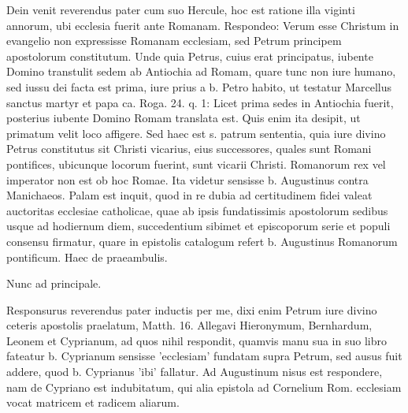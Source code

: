 Dein venit reverendus pater cum suo Hercule, hoc est ratione illa viginti annorum, ubi ecclesia fuerit ante Romanam. Respondeo: Verum esse Christum in evangelio non expressisse Romanam ecclesiam, sed Petrum principem apostolorum constitutum. Unde quia Petrus, cuius erat principatus, iubente Domino transtulit sedem ab Antiochia ad Romam, quare tunc non iure humano, sed iussu dei facta est prima, iure prius a b. Petro habito, ut testatur Marcellus sanctus martyr et papa ca. Roga. 24. q. 1: Licet prima sedes in Antiochia fuerit, posterius iubente Domino Romam translata est. Quis enim ita desipit, ut primatum velit loco affigere. Sed haec est s. patrum sententia, quia iure divino Petrus constitutus sit Christi vicarius, eius successores, quales sunt Romani pontifices, ubicunque locorum fuerint, sunt vicarii Christi. Romanorum rex vel imperator non est ob hoc Romae. Ita videtur sensisse b. Augustinus contra Manichaeos. Palam est inquit, quod in re dubia ad certitudinem fidei valeat auctoritas ecclesiae catholicae, quae ab ipsis fundatissimis apostolorum sedibus usque ad hodiernum diem, succedentium sibimet et episcoporum serie et populi consensu firmatur, quare in epistolis catalogum refert b. Augustinus Romanorum pontificum. Haec de praeambulis.

Nunc ad principale.

Responsurus reverendus pater inductis per me, dixi enim Petrum iure divino ceteris apostolis praelatum, Matth. 16. Allegavi Hieronymum, Bernhardum, Leonem et Cyprianum, ad quos nihil respondit, quamvis manu sua in suo libro fateatur b. Cyprianum sensisse 'ecclesiam' fundatam supra Petrum, sed ausus fuit addere, quod b. Cyprianus 'ibi' fallatur. Ad Augustinum nisus est respondere, nam de Cypriano est indubitatum, qui alia epistola ad Cornelium Rom. ecclesiam vocat matricem et radicem aliarum.

